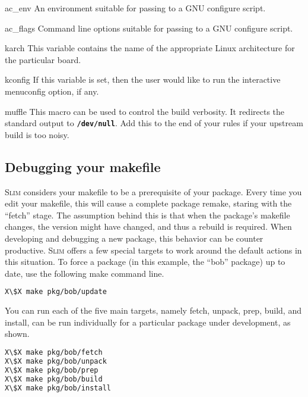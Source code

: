 \documentclass[a4paper,10pt]{article}
\newenvironment{Description}[1][\quad]{%
  \begin{list}{}{%
      \renewcommand{\makelabel}[1]{\textbf{##1}\hfill}%
      \settowidth{\labelwidth}{\textbf{#1}}%
      \setlength{\leftmargin}{\labelwidth+\labelsep}%
  }%
}{%
  \end{list}%
}
\newcommand{\slim}{\textsc{Slim}\xspace}
\newcommand{\fw}{\tt\bf}
\begin{document}
\begin{Description}[HOSTCCX]
    \item[ac\_env]
      An environment suitable for passing to a GNU configure script.

    \item[ac\_flags]
      Command line options suitable for passing to a GNU configure
      script.

    \item[karch]
      This variable contains the name of the appropriate Linux
      architecture for the particular board.

    \item[kconfig]
      If this variable is set, then the user would like to run the
      interactive menuconfig option, if any.

    \item[muffle]
      This macro can be used to control the build verbosity. It
      redirects the standard output to {\fw /dev/null}. Add this to
      the end of your rules if your upstream build is too noisy.

    \end{Description}

\subsection{Debugging your makefile}

    \slim considers your makefile to be a prerequisite of your
    package. Every time you edit your makefile, this will cause a
    complete package remake, staring with the ``fetch'' stage.
    The assumption behind this is that when the package's makefile
    changes, the version might have changed, and thus a rebuild is
    required. When developing and debugging a new package, this
    behavior can be counter productive. \slim offers a few special
    targets to work around the default actions in this situation.
    To force a package (in this example, the ``bob'' package) up
    to date, use the following make command line.

\begin{lstlisting}[language=bash,escapechar=X]
X\$X make pkg/bob/update
\end{lstlisting}

    You can run each of the five main targets, namely fetch, unpack,
    prep, build, and install, can be run individually for a particular
    package under development, as shown.

\begin{lstlisting}[language=bash,escapechar=X]
X\$X make pkg/bob/fetch
X\$X make pkg/bob/unpack
X\$X make pkg/bob/prep
X\$X make pkg/bob/build
X\$X make pkg/bob/install
\end{lstlisting}
\end{document}
